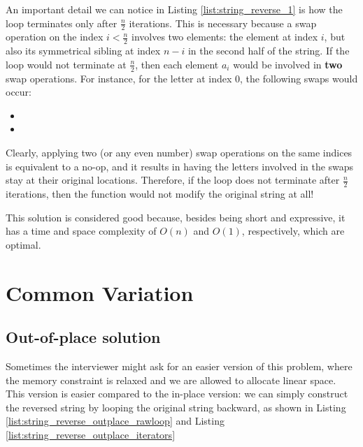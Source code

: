 An important detail we can notice in Listing \ref{list:string_reverse_1} is how the loop terminates only after $\frac{n}{2}$ iterations.
This is necessary because a swap operation on the index $i<\frac{n}{2}$ involves two elements: the element at index $i$, but also its symmetrical sibling at index $n-i$ in the second half of the string.
If the loop would not terminate at $\frac{n}{2}$, then each element $a_i$ would be involved in \textbf{two} swap operations. 
For instance, for the letter at index $0$, the following swaps would occur:
\begin{itemize}
	\item {}
	\item {}
\end{itemize}
Clearly, applying two (or any even number) swap operations on the same indices is equivalent to a no-op, and it results in having the letters involved in the swaps stay at their original locations.
Therefore, if the loop does not terminate after $\frac{n}{2}$ iterations, then the function would not modify the original string at all! 

This solution is considered good because, besides being short and expressive, it has a time and space complexity of $O(n)$ and $O(1)$, respectively, which are optimal.

\section{Common Variation}
\label{string_reverse:sec:variations}

\subsection{Out-of-place solution}
Sometimes the interviewer might ask for an easier version of this problem, where the memory constraint is relaxed and we are allowed to allocate linear space.
This version is easier compared to the in-place version: we can simply construct the reversed string by looping the original string backward, as shown in Listing \ref{list:string_reverse_outplace_rawloop} and Listing \ref{list:string_reverse_outplace_iterators}





